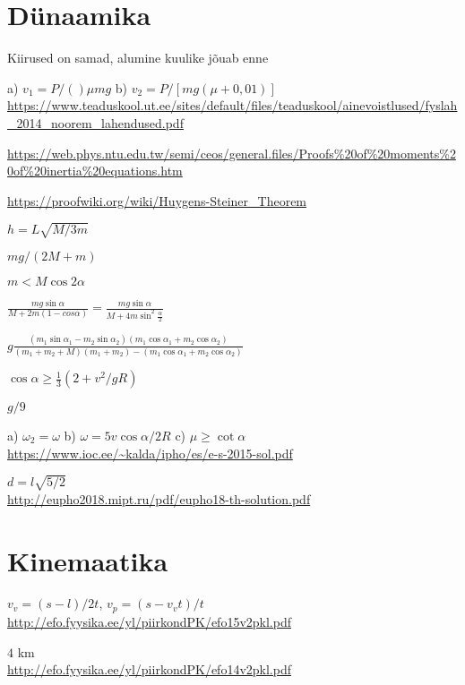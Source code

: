 \documentclass[a4paper,11pt,twocolumn]{article}
\begin{document}
\section{Dünaamika}
\begin{solutions}
	\item Kiirused on samad, alumine kuulike jõuab enne
	\item a) \( v_1={P}/()\mu mg \) b) \( v_2={P}/[mg(\mu+0,01)] \) \\ \url{https://www.teaduskool.ut.ee/sites/default/files/teaduskool/ainevoistlused/fyslah_2014_noorem_lahendused.pdf}
	\item
	\item \url{https://web.phys.ntu.edu.tw/semi/ceos/general.files/Proofs%20of%20moments%20of%20inertia%20equations.htm}
	\item
	\item
	\item \url{https://proofwiki.org/wiki/Huygens-Steiner_Theorem}
	\item \( h=L\sqrt{M/3m} \)
	\item \( {mg}/(2M+m) \)
	\item \( m<M\cos 2\alpha \)
	\item \(\frac{mg\sin\alpha}{M+2m(1-cos\alpha)}=\frac{mg\sin\alpha}{M+4m\sin^2 \frac{\alpha}{2}} \)
	\item \( g\frac{(m_1\sin\alpha_1-m_2\sin\alpha_2)(m_1\cos\alpha_1+m_2\cos\alpha_2)}{(m_1+m_2+M)(m_1+m_2)-(m_1\cos\alpha_1+m_2\cos\alpha_2)} \)
	\item \( \cos\alpha \ge \frac{1}{3}(2+{v^2}/{gR}) \)
	\item \( g/9 \)
	\item a) \( \omega_2=\omega \) b) \( \omega=5v\cos\alpha/2R \) c) \( \mu \ge \cot \alpha \)
	\url{https://www.ioc.ee/~kalda/ipho/es/e-s-2015-sol.pdf}
	\item \( d=l\sqrt{5/2} \) \\
	\url{http://eupho2018.mipt.ru/pdf/eupho18-th-solution.pdf}
\end{solutions}

\section{Kinemaatika}
\begin{solutions}
	\item \( v_v=(s-l)/2t \), \( v_p=(s-v_vt)/t \) \\ \url{http://efo.fyysika.ee/yl/piirkondPK/efo15v2pkl.pdf}
	\item \( 4 \) km \\ \url{http://efo.fyysika.ee/yl/piirkondPK/efo14v2pkl.pdf}
	\item
\end{solutions}
\end{document}
